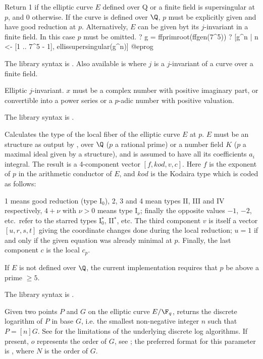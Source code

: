 \label{se:ellissupersingular}
Return 1 if the elliptic curve $E$ defined over Q or a finite field is supersingular
at $p$, and $0$ otherwise.
If the curve is defined over $\Q$, $p$ must be explicitly given and have good
reduction at $p$.
Alternatively, $E$ can be given byt its $j$-invariant in a finite field. In
this case $p$ must be omitted.
\bprog
? g = ffprimroot(ffgen(7^5))
? [g^n | n <- [1 .. 7^5 - 1], ellissupersingular(g^n)]
@eprog

The library syntax is .
Also available is
 where $j$ is a $j$-invariant of a curve
over a finite field.

\label{se:ellj}
Elliptic $j$-invariant. $x$ must be a complex number
with positive imaginary part, or convertible into a power series or a
$p$-adic number with positive valuation.

The library syntax is .

\label{se:elllocalred}
Calculates the  type of the local fiber of the elliptic curve
$E$ at $p$. $E$ must be an  structure as output by
, over $\Q$ ($p$ a rational prime) or a number field $K$ ($p$
a maximal ideal given by a  structure), and is assumed to have all
its coefficients $a_i$ integral.
The result is a 4-component vector $[f,kod,v,c]$. Here $f$ is the exponent of
$p$ in the arithmetic conductor of $E$, and $kod$ is the Kodaira type which
is coded as follows:

1 means good reduction (type I$_0$), 2, 3 and 4 mean types II, III and IV
respectively, $4+\nu$ with $\nu>0$ means type I$_\nu$;
finally the opposite values $-1$, $-2$, etc.~refer to the starred types
I$_0^*$, II$^*$, etc. The third component $v$ is itself a vector $[u,r,s,t]$
giving the coordinate changes done during the local reduction;
$u = 1$ if and only if the given equation was already minimal at $p$.
Finally, the last component $c$ is the local  $c_p$.

 If $E$ is not defined over $\Q$, the current
implementation requires that $p$ be above a prime $\geq 5$.

The library syntax is .

\label{se:elllog}
Given two points $P$ and $G$ on the elliptic curve $E/\F_q$, returns the
discrete logarithm of $P$ in base $G$, i.e. the smallest non-negative
integer $n$ such that $P = [n]G$.
See  for the limitations of the underlying discrete log algorithms.
If present, $o$ represents the order of $G$, see ;
the preferred format for this parameter is \kbd{[N, factor(N)]}, where $N$
is  the order of $G$.

